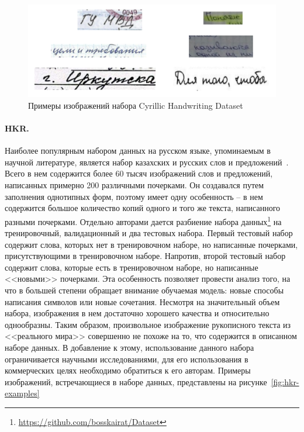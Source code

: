 \begin{figure}[h!]
    \centering
    \includegraphics[width=\textwidth]{img/cyrillic}
    \caption{Примеры изображений набора Cyrillic Handwriting Dataset}
    \label{fig:cyrillic-examples}
\end{figure}

\paragraph{HKR.}{Наиболее популярным набором данных на русском языке, упоминаемым в научной литературе, является набор казахских и русских слов и предложений~\cite{nurseitov2021handwritten}.
Всего в нем содержится более 60 тысяч изображений слов и предложений, написанных примерно 200 различными почерками.
Он создавался путем заполнения однотипных форм, поэтому имеет одну особенность -- в нем содержится большое количество копий одного и того же текста, написанного разными почерками.
Отдельно авторами дается разбиение набора данных\footnote{\url{https://github.com/bosskairat/Dataset}} на тренировочный, валидационный и два тестовых набора.
Первый тестовый набор содержит слова, которых нет в тренировочном наборе, но написанные почерками, присутствующими в тренировочном наборе.
Напротив, второй тестовый набор содержит слова, которые есть в тренировочном наборе, но написанные <<новыми>> почерками.
Эта особенность позволяет провести анализ того, на что в большей степени обращает внимание обучаемая модель: новые способы написания символов или новые сочетания.
Несмотря на значительный объем набора, изображения в нем достаточно хорошего качества и относительно однообразны.
Таким образом, произвольное изображение рукописного текста из <<реального мира>> совершенно не похоже на то, что содержится в описанном наборе данных.
В добавление к этому, использование данного набора ограничивается научными исследованиями, для его использования в коммерческих целях необходимо обратиться к его авторам.
Примеры изображений, встречающиеся в наборе данных, представлены на рисунке~\ref{fig:hkr-examples}}

